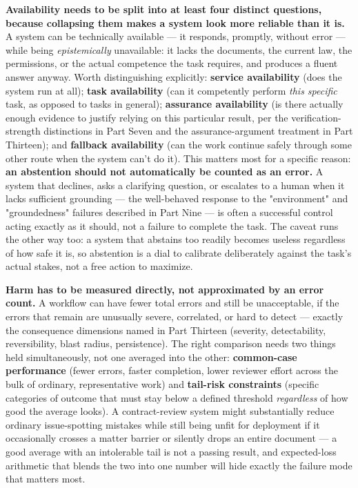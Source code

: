 \textbf{Availability needs to be split into at least four distinct questions, because collapsing them makes a system look more reliable than it is.} A system can be technically available --- it responds, promptly, without error --- while being \emph{epistemically} unavailable: it lacks the documents, the current law, the permissions, or the actual competence the task requires, and produces a fluent answer anyway. Worth distinguishing explicitly: \textbf{service availability} (does the system run at all); \textbf{task availability} (can it competently perform \emph{this specific} task, as opposed to tasks in general); \textbf{assurance availability} (is there actually enough evidence to justify relying on this particular result, per the verification-strength distinctions in Part Seven and the assurance-argument treatment in Part Thirteen); and \textbf{fallback availability} (can the work continue safely through some other route when the system can't do it). This matters most for a specific reason: \textbf{an abstention should not automatically be counted as an error.} A system that declines, asks a clarifying question, or escalates to a human when it lacks sufficient grounding --- the well-behaved response to the "environment" and "groundedness" failures described in Part Nine --- is often a successful control acting exactly as it should, not a failure to complete the task. The caveat runs the other way too: a system that abstains too readily becomes useless regardless of how safe it is, so abstention is a dial to calibrate deliberately against the task's actual stakes, not a free action to maximize.

\textbf{Harm has to be measured directly, not approximated by an error count.} A workflow can have fewer total errors and still be unacceptable, if the errors that remain are unusually severe, correlated, or hard to detect --- exactly the consequence dimensions named in Part Thirteen (severity, detectability, reversibility, blast radius, persistence). The right comparison needs two things held simultaneously, not one averaged into the other: \textbf{common-case performance} (fewer errors, faster completion, lower reviewer effort across the bulk of ordinary, representative work) and \textbf{tail-risk constraints} (specific categories of outcome that must stay below a defined threshold \emph{regardless} of how good the average looks). A contract-review system might substantially reduce ordinary issue-spotting mistakes while still being unfit for deployment if it occasionally crosses a matter barrier or silently drops an entire document --- a good average with an intolerable tail is not a passing result, and expected-loss arithmetic that blends the two into one number will hide exactly the failure mode that matters most.

